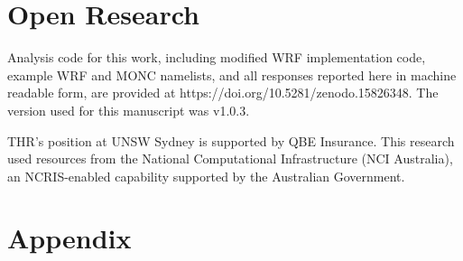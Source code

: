 \documentclass[draft]{agujournal2019}
\begin{document}
\section{Open Research}

Analysis code for this work, including modified WRF implementation code, example
WRF and MONC namelists, and all responses reported here in machine readable
form, are provided at https://doi.org/10.5281/zenodo.15826348. The version used
for this manuscript was v1.0.3.

\acknowledgments

THR's position at UNSW Sydney is supported by QBE Insurance. This research used
resources from the National Computational Infrastructure (NCI Australia), an
NCRIS-enabled capability supported by the Australian Government.



%



\newpage
\section*{Appendix}
\setcounter{figure}{0}
\renewcommand{\thefigure}{A\arabic{figure}}
\end{document}
